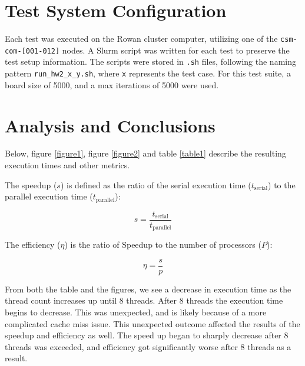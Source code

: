 \documentclass{article}
\begin{document}
	\section{Test System Configuration}
	Each test was executed on the Rowan cluster computer, utilizing one of the \texttt{csm-com-[001-012]} nodes. A Slurm script was written for each test to preserve the test setup information. The scripts were stored in \texttt{.sh} files, following the naming pattern \texttt{run\_hw2\_x\_y.sh}, where \texttt{x} represents the test case. For this test suite, a board size of 5000, and a max iterations of 5000 were used.

	\section{Analysis and Conclusions}
	Below, figure \ref{figure1}, figure \ref{figure2} and table \ref{table1} describe the resulting execution times and other metrics.
	
	The speedup (\(s\)) is defined as the ratio of the serial execution time (\(t_{\text{serial}}\)) to the parallel execution time (\(t_{\text{parallel}}\)):

\[s = \frac{t_{\text{serial}}}{t_{\text{parallel}}}\]

The efficiency (\(\eta\)) is the ratio of Speedup to the number of processors (\(P\)):

\[\eta = \frac{s}{p}\]

From both the table and the figures, we see a decrease in execution time as the thread count increases up until 8 threads. After 8 threads the execution time begins to decrease. This was unexpected, and is likely because of a more complicated cache miss issue. This unexpected outcome affected the results of the speedup and efficiency as well. The speed up began to sharply decrease after 8 threads was exceeded, and efficiency got significantly worse after 8 threads as a result.
	
	
	
\end{document}

